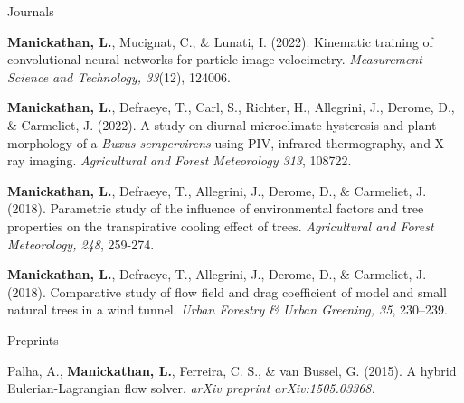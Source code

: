 \documentclass[11pt, a4paper]{preamble/awesome-cv-novo}
\begin{document}
\newpage


\begin{cventries}

  \cvpubentry
  {Journals} %
  {
    \begin{cvitems}
      \item {\textbf{Manickathan, L.}, Mucignat, C., \& Lunati, I. (2022). Kinematic training of convolutional neural
             networks for particle image velocimetry. {\bodyfontlight\textit{Measurement Science and Technology, 33}(12),
              124006.}}
      \item {\textbf{Manickathan, L.}, Defraeye, T., Carl, S., Richter, H., Allegrini, J., Derome, D., \& Carmeliet,
             J. (2022). A study on diurnal microclimate hysteresis and plant morphology of a \textit{Buxus
             sempervirens} using PIV, infrared thermography, and X-ray imaging. {\bodyfontlight\textit{Agricultural
             and Forest Meteorology 313}, 108722.}}
      \item {\textbf{Manickathan, L.}, Defraeye, T., Allegrini, J., Derome, D., \& Carmeliet, J. (2018). Parametric
             study of the influence of environmental factors and tree properties on the transpirative cooling
             effect of trees. {\bodyfontlight\textit{Agricultural and Forest Meteorology, 248}, 259-274.}}
      \item {\textbf{Manickathan, L.}, Defraeye, T., Allegrini, J., Derome, D., \& Carmeliet, J. (2018).
             Comparative study of flow field and drag coefficient of model and small natural trees in a wind tunnel.
             {\bodyfontlight\textit{Urban Forestry \& Urban Greening, 35}, 230–239.}}
    \end{cvitems}
  }

  \cvpubentry
  {Preprints}
  {
    \begin{cvitems}
      \item {Palha, A., \textbf{Manickathan, L.}, Ferreira, C. S., \& van Bussel, G. (2015). A hybrid
             Eulerian-Lagrangian flow solver. {\bodyfontlight\textit{arXiv preprint arXiv:1505.03368.}}}
    \end{cvitems}
  }


\end{cventries}
\end{document}

